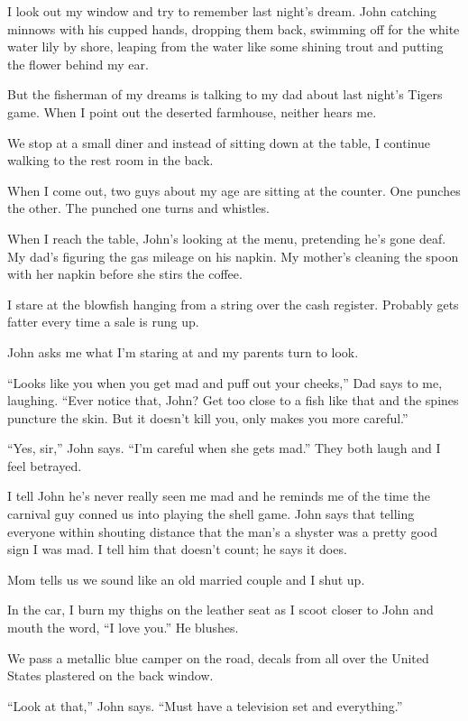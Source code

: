 \documentclass[twoside,10pt]{book}
\begin{document}
I look out my window and try to remember last night's dream. John
catching minnows with his cupped hands, dropping them back, swimming off
for the white water lily by shore, leaping from the water like some
shining trout and putting the flower behind my ear.

But the fisherman of my dreams is talking to my dad about last night's
Tigers game. When I point out the deserted farmhouse, neither hears me.

We stop at a small diner and instead of sitting down at the table, I
continue walking to the rest room in the back.

When I come out, two guys about my age are sitting at the counter. One
punches the other. The punched one turns and whistles.

When I reach the table, John's looking at the menu, pretending he's gone
deaf. My dad's figur­ing the gas mileage on his napkin. My mother's
cleaning the spoon with her napkin before she stirs the coffee.

I stare at the blowfish hanging from a string over the cash register.
Probably gets fatter every time a sale is rung up.

John asks me what I'm staring at and my parents turn to look.

``Looks like you when you get mad and puff out your cheeks,'' Dad says
to me, laughing. ``Ever notice that, John? Get too close to a fish like
that and the spines puncture the skin. But it doesn't kill you, only
makes you more careful.''

``Yes, sir,'' John says. ``I'm careful when she gets mad.'' They both
laugh and I feel betrayed.

I tell John he's never really seen me mad and he reminds me of the time
the carnival guy conned us into playing the shell game. John says that
telling everyone within shouting distance that the man's a shyster was a
pretty good sign I was mad. I tell him that doesn't count; he says it
does.

Mom tells us we sound like an old married couple and I shut up.

In the car, I burn my thighs on the leather seat as I scoot closer to
John and mouth the word, ``I love you.'' He blushes.

We pass a metallic blue camper on the road, decals from all over the
United States plastered on the back window.

``Look at that,'' John says. ``Must have a television set and
everything.''
\end{document}
